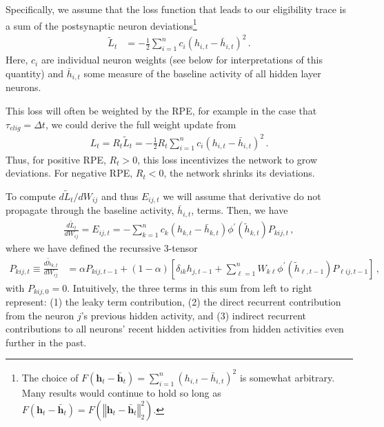 \documentclass[
  journal=medium,
  manuscript=preprint,
  year=2026
]{aind-preprint}
\begin{document}
Specifically, we assume that the loss function that leads to our eligibility trace is a sum of the postsynaptic neuron deviations\footnote{The choice of $F\left(\mathbf{h}_t - \bar{\mathbf{h}}_t\right) = \sum_{i=1}^n \left(h_{i,t} - \bar{h}_{i,t}\right)^2$ is somewhat arbitrary. 
Many results would continue to hold so long as $F\left(\mathbf{h}_t - \bar{\mathbf{h}}_t\right) = F\left(\left\Vert\mathbf{h}_t - \bar{\mathbf{h}}_t\right\Vert_2^2\right)$.
}
\begin{align}
    \tilde{L}_t &=  -\frac{1}{2}\sum_{i=1}^n c_i \left(h_{i,t} - \bar{h}_{i,t}\right)^2\,.
\end{align}
Here, $c_i$ are individual neuron weights (see below for interpretations of this quantity) and $\bar{h}_{i,t}$ some measure of the baseline activity of all hidden layer neurons.

This loss will often be weighted by the RPE, for example in the case that $\tau_{elig} = \Delta t$, we could derive the full weight update from
\begin{align}
    L_t = R_t \tilde{L}_t = -\frac{1}{2} R_t \sum_{i=1}^n c_i \left(h_{i,t} - \bar{h}_{i,t}\right)^2\,.
\end{align}
Thus, for positive RPE, $R_t > 0$, this loss incentivizes the network to grow deviations. 
For negative RPE, $R_t < 0$, the network shrinks its deviations.

To compute $d\tilde{L}_t / dW_{ij}$ and thus $E_{ij,t}$ we will assume that derivative do not propagate through the baseline activity, $\bar{h}_{i,t}$, terms.
Then, we have
\begin{align}
    \frac{d \tilde{L}_t}{d W_{ij}} = E_{ij,t} = - \sum_{k=1}^n c_k \left(h_{k,t} - \bar{h}_{k,t}\right) \phi^\prime\left(\tilde{h}_{k,t}\right) P_{kij,t}\,, 
    \label{eq:our_lr_exact}
\end{align}
where we have defined the recurssive 3-tensor
\begin{align}
    P_{kij,t}  \equiv \frac{d\tilde{h}_{k,t}}{dW_{ij}} &= \alpha P_{kij,t-1} + \left(1-\alpha\right)\left[ \delta_{ik}h_{j,t-1}+\sum_{\ell=1}^n W_{k\ell} \phi^\prime\left(\tilde{h}_{\ell,t-1}\right) P_{\ell ij,t-1}\right]\,, \label{eq:P_kij,t}
\end{align}
with $P_{kij,0} = 0$.
Intuitively, the three terms in this sum from left to right represent: (1) the leaky term contribution, (2) the direct recurrent contribution from the neuron $j$'s previous hidden activity, and (3) indirect recurrent contributions to all neurons' recent hidden activities from hidden activities even further in the past.
\end{document}
